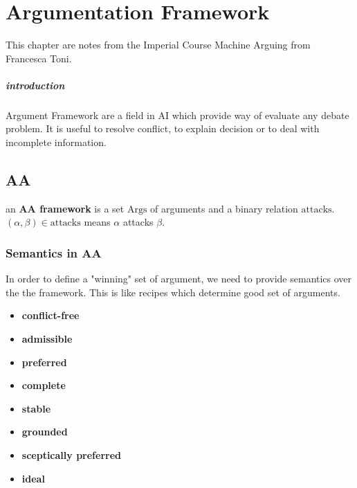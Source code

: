 \chapter{Argumentation Framework} %
\label{cha:argumentation_framework}

This chapter are notes from the Imperial Course Machine Arguing from Francesca Toni. 

\paragraph{introduction} %
\label{par:introduction}

Argument Framework are a field in AI which provide way of evaluate any debate problem. It is useful to resolve conflict, to explain decision or to deal with incomplete information. 
\section{AA}

\begin{definition}
 		an  \textbf{AA framework} is a set $\mathrm{Args}$ of arguments and a binary relation $\mathrm{attacks}$. $(\alpha, \beta)\in \mathrm{attacks}$ means $\alpha$ attacks $\beta$.
\end{definition} 

\subsection{Semantics in AA}

In order to define a "winning" set of argument, we need to provide semantics over the the framework. This is like recipes which determine good set of arguments. 

\begin{definition}

\begin{itemize}
	\item \textbf{conflict-free}
	\item \textbf{admissible}
	\item \textbf{preferred}
	\item \textbf{complete}
	\item \textbf{stable}
	\item \textbf{grounded}
	\item \textbf{sceptically preferred}
	\item \textbf{ideal}
\end{itemize}
\end{definition}

